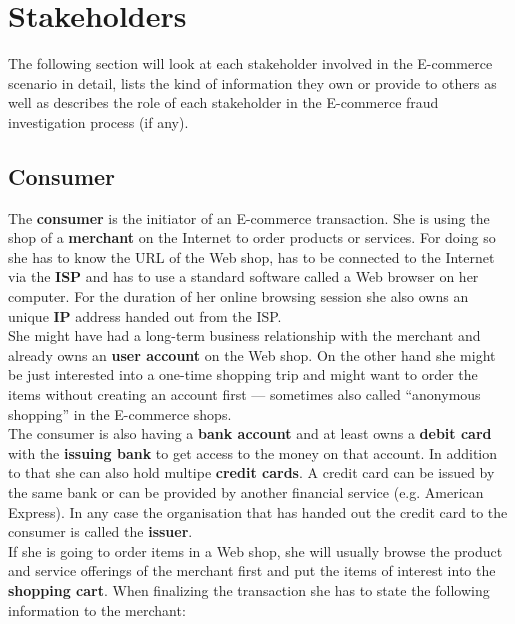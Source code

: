 
\section{Stakeholders}
\label{sec:stakeholder_analysis}

The following section will look at each stakeholder involved in the E-commerce scenario in detail, lists the kind of information they own or provide to others as well as describes the role of each stakeholder in the E-commerce fraud investigation process (if any).

\subsection{Consumer}
\label{subsec:stakeholder_consumer}

The \textbf{consumer} is the initiator of an E-commerce transaction. She is using the shop of a \textbf{merchant} on the Internet to order products or services. For doing so she has to know the \gls{URL} of the Web shop, has to be connected to the Internet via the \textbf{\gls{ISP}} and has to use a standard software called a Web browser on her computer. For the duration of her online browsing session she also owns an unique \textbf{\gls{IP}} address handed out from the \gls{ISP}.\\

She might have had a long-term business relationship with the merchant and already owns an \textbf{user account} on the Web shop. On the other hand she might be just interested into a one-time shopping trip and might want to order the items without creating an account first --- sometimes also called ``anonymous shopping'' in the E-commerce shops. \\

The consumer is also having a \textbf{bank account} and at least owns a \textbf{debit card} with the \textbf{issuing bank} to get access to the money on that account. In addition to that she can also hold multipe \textbf{credit cards}. A credit card can be issued by the same bank or can be provided by another financial service (e.g. American Express). In any case the organisation that has handed out the credit card to the consumer is called the \textbf{issuer}. \\

If she is going to order items in a Web shop, she will usually browse the product and service offerings of the merchant first and put the items of interest into the \textbf{shopping cart}. When finalizing the transaction she has to state the following information to the merchant:\@

